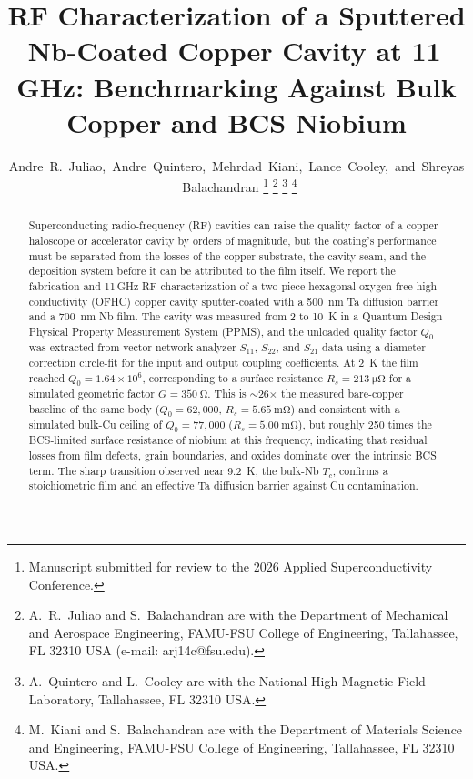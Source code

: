\documentclass[10pt,journal]{IEEEtran}
\begin{document}
\title{RF Characterization of a Sputtered Nb-Coated Copper Cavity at 11\,GHz: Benchmarking Against Bulk Copper and BCS Niobium}

\author{Andre~R.~Juliao,~Andre~Quintero,~Mehrdad~Kiani,~Lance~Cooley,~and~Shreyas~Balachandran%
\thanks{Manuscript submitted for review to the 2026 Applied Superconductivity Conference.}%
\thanks{A.~R.~Juliao and S.~Balachandran are with the Department of Mechanical and Aerospace Engineering, FAMU-FSU College of Engineering, Tallahassee, FL 32310 USA (e-mail: arj14c@fsu.edu).}%
\thanks{A.~Quintero and L.~Cooley are with the National High Magnetic Field Laboratory, Tallahassee, FL 32310 USA.}%
\thanks{M.~Kiani and S.~Balachandran are with the Department of Materials Science and Engineering, FAMU-FSU College of Engineering, Tallahassee, FL 32310 USA.}%
}

\maketitle

\begin{abstract}
Superconducting radio-frequency (RF) cavities can raise the quality factor of a copper haloscope or accelerator cavity by orders of magnitude, but the coating's performance must be separated from the losses of the copper substrate, the cavity seam, and the deposition system before it can be attributed to the film itself. We report the fabrication and 11\,GHz RF characterization of a two-piece hexagonal oxygen-free high-conductivity (OFHC) copper cavity sputter-coated with a \SI{500}{\nano\meter} Ta diffusion barrier and a \SI{700}{\nano\meter} Nb film. The cavity was measured from 2 to \SI{10}{\kelvin} in a Quantum Design Physical Property Measurement System (PPMS), and the unloaded quality factor $Q_0$ was extracted from vector network analyzer $S_{11}$, $S_{22}$, and $S_{21}$ data using a diameter-correction circle-fit for the input and output coupling coefficients. At \SI{2}{\kelvin} the film reached $Q_0 = 1.64\times10^{6}$, corresponding to a surface resistance $R_s = \SI{213}{\micro\ohm}$ for a simulated geometric factor $G=\SI{350}{\ohm}$. This is $\sim$26$\times$ the measured bare-copper baseline of the same body ($Q_0=62{,}000$, $R_s=\SI{5.65}{\milli\ohm}$) and consistent with a simulated bulk-Cu ceiling of $Q_0=77{,}000$ ($R_s=\SI{5.00}{\milli\ohm}$), but roughly 250 times the BCS-limited surface resistance of niobium at this frequency, indicating that residual losses from film defects, grain boundaries, and oxides dominate over the intrinsic BCS term. The sharp transition observed near \SI{9.2}{\kelvin}, the bulk-Nb $T_c$, confirms a stoichiometric film and an effective Ta diffusion barrier against Cu contamination.
\end{abstract}
\end{document}
